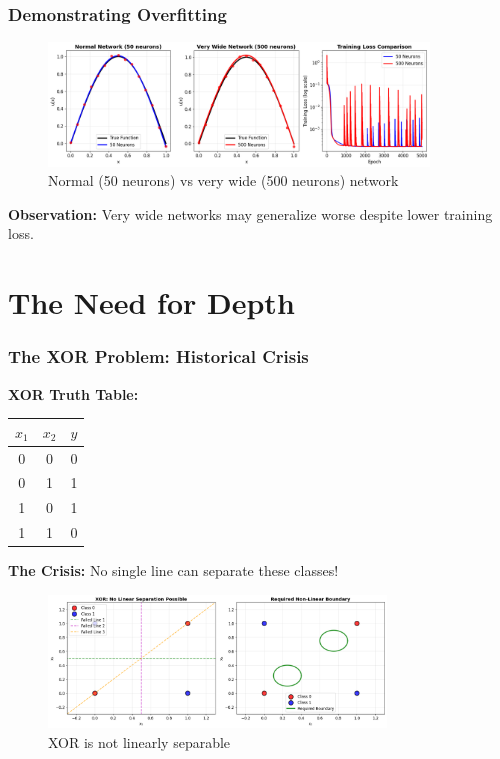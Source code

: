 \documentclass[notes]{beamer}
\begin{document}
\begin{frame}
\frametitle{Demonstrating Overfitting}

\begin{figure}[ht]
	\centering
	\includegraphics[width=0.9\textwidth]{figs/overfitting-demo.png}
	\caption*{Normal (50 neurons) vs very wide (500 neurons) network}
\end{figure}

\textbf{Observation:} Very wide networks may generalize worse despite lower training loss.

\end{frame}

\section{The Need for Depth}

\begin{frame}
\frametitle{The XOR Problem: Historical Crisis}

\textbf{XOR Truth Table:}
\begin{center}
\begin{tabular}{cc|c}
$x_1$ & $x_2$ & $y$ \\
\hline
0 & 0 & 0 \\
0 & 1 & 1 \\
1 & 0 & 1 \\
1 & 1 & 0 \\
\end{tabular}
\end{center}

\textbf{The Crisis:} No single line can separate these classes!

\begin{figure}[ht]
	\centering
	\includegraphics[width=0.8\textwidth]{figs/xor-problem.png}
	\caption*{XOR is not linearly separable}
\end{figure}

\end{frame}
\end{document}
